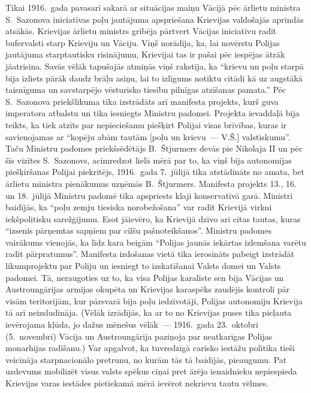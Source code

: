 \documentclass[twoside,a5paper,12pt,fleqn,openany]{extbook}
\begin{document}
Tikai 1916.~gada pavasarī sakarā ar situācijas maiņu Vācijā pēc ārlietu ministra S.~Sazonova iniciatīvas poļu jautājuma apspriešana Krievijas valdošajās aprindās atsākās. Krievijas ārlietu ministrs gribēja pārtvert Vācijas iniciatīvu radīt bufervalsti starp Krieviju un Vāciju. Viņš norādīja, ka, lai novērstu Polijas jautājuma starptautisku risinājumu, Krievijai tas ir pašai pēc iespējas ātrāk jāatrisina. Savās vēlāk tapušajās atmiņās viņš rakstīja, ka ``krievu un poļu starpā bija izliets pārāk daudz brāļu asiņu, lai to izlīgums notiktu citādi kā uz augstākā taisnīguma un savstarpējo vēsturisko tiesību pilnīgas atzīšanas pamata.'' Pēc S.~Sazonova priekšlikuma tika izstrādāts arī manifesta projekts, kurš guva imperatora atbalstu un tika iesniegts Ministru padomei. Projekta ievaddaļā bija teikts, ka tiek atzīts par nepieciešamu piešķirt Polijai visas brīvības, kuras ir savienojamas ar ``kopēju abām tautām [poļu un krievu~--- V.Š.] valstiskumu''. Taču Ministru padomes priekšsēdētājs B.~Štjurmers devās pie Nikolaja II un pēc šīs vizītes S.~Sazonovs, acīmredzot lielā mērā par to, ka viņš bija autonomijas piešķiršanas Polijai piekritējs, 1916.~gada 7.~jūlijā tika atstādināts no amata, bet ārlietu ministra pienākumus uzņēmās B.~Štjurmers. Manifesta projekts 13., 16. un 18.~jūlijā Ministru padomē tika apspriests klaji konservatīvā garā. Ministri baidījās, ka ``poļu zemju tiesiska norobežošana'' var radīt Krievijā virkni iekšpolitisku sarežģījumu. Esot jāievēro, ka Krievijā dzīvo arī citas tautas, kuras ``izsenis pārņemtas sapņiem par cilšu pašnoteikšanos''. Ministru padomes vairākums vienojās, ka līdz kara beigām ``Polijas jaunās iekārtas izlemšana varētu radīt pārpratumus''. Manifesta izdošanas vietā tika ierosināts pabeigt izstrādāt likumprojektu par Poliju un iesniegt to izskatīšanai Valsts domei un Valsts padomei. Tā, neraugoties uz to, ka visa Polijas karaliste sen bija Vācijas un Austroungārijas armijas okupēta un Krievijas karaspēks zaudējis kontroli pār visām teritorijām, kur pārsvarā bija poļu iedzīvotāji, Polijas autonomiju Krievija tā arī neizsludināja. (Vēlāk izrādījās, ka ar to no Krievijas puses tika pieļauta ievērojama kļūda, jo dažus mēnešus vēlāk~--- 1916.~gada 23.~oktobrī (5.~novembrī) Vācija un Austroungārija paziņoja par neatkarīgas Polijas monarhijas radīšanu.) Var apgalvot, ka tuvredzīgā carisko iestāžu politika tieši veicināja starpnacionālo pretrunu, no kurām tās tā baidījās, pieaugumu. Pat uzdevums mobilizēt visus valsts spēkus cīņai pret ārējo ienaidnieku nepiespieda Krievijas varas iestādes pietiekamā mērā ievērot nekrievu tautu vēlmes.
\end{document}
